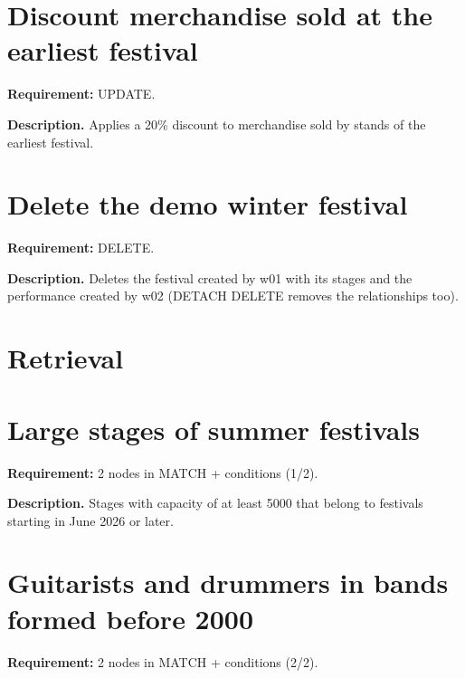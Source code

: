 \section{Discount merchandise sold at the earliest festival}
\textbf{Requirement:} UPDATE.

\textbf{Description.} Applies a 20\% discount to merchandise sold by stands of the earliest festival. 



\section{Delete the demo winter festival}
\textbf{Requirement:} DELETE.

\textbf{Description.} Deletes the festival created by w01 with its stages and the performance created by w02 (DETACH DELETE removes the relationships too). 



\section*{Retrieval}
\section{Large stages of summer festivals}
\textbf{Requirement:} 2 nodes in MATCH + conditions (1/2).

\textbf{Description.} Stages with capacity of at least 5000 that belong to festivals starting in June 2026 or later. 



\section{Guitarists and drummers in bands formed before 2000}
\textbf{Requirement:} 2 nodes in MATCH + conditions (2/2).


